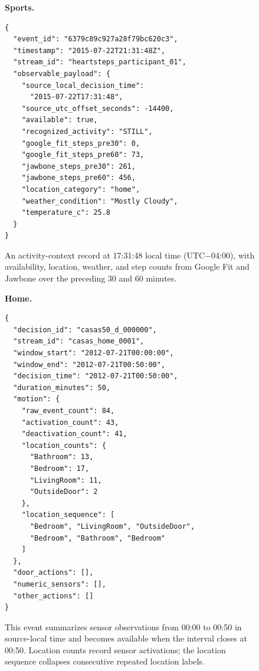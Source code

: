 \begin{figure}[p]
\centering
\begin{minipage}[t]{0.48\textwidth}
\textbf{Sports.}
\begin{lstlisting}[style=inputevent]
{
  "event_id": "6379c89c927a28f79bc620c3",
  "timestamp": "2015-07-22T21:31:48Z",
  "stream_id": "heartsteps_participant_01",
  "observable_payload": {
    "source_local_decision_time":
      "2015-07-22T17:31:48",
    "source_utc_offset_seconds": -14400,
    "available": true,
    "recognized_activity": "STILL",
    "google_fit_steps_pre30": 0,
    "google_fit_steps_pre60": 73,
    "jawbone_steps_pre30": 261,
    "jawbone_steps_pre60": 456,
    "location_category": "home",
    "weather_condition": "Mostly Cloudy",
    "temperature_c": 25.8
  }
}
\end{lstlisting}
An activity-context record at 17:31:48 local time (UTC$-$04:00), with availability, location, weather, and step counts from Google Fit and Jawbone over the preceding 30 and 60 minutes.
\end{minipage}\hfill
\begin{minipage}[t]{0.48\textwidth}
\textbf{Home.}
\begin{lstlisting}[style=inputevent]
{
  "decision_id": "casas50_d_000000",
  "stream_id": "casas_home_0001",
  "window_start": "2012-07-21T00:00:00",
  "window_end": "2012-07-21T00:50:00",
  "decision_time": "2012-07-21T00:50:00",
  "duration_minutes": 50,
  "motion": {
    "raw_event_count": 84,
    "activation_count": 43,
    "deactivation_count": 41,
    "location_counts": {
      "Bathroom": 13,
      "Bedroom": 17,
      "LivingRoom": 11,
      "OutsideDoor": 2
    },
    "location_sequence": [
      "Bedroom", "LivingRoom", "OutsideDoor",
      "Bedroom", "Bathroom", "Bedroom"
    ]
  },
  "door_actions": [],
  "numeric_sensors": [],
  "other_actions": []
}
\end{lstlisting}
This event summarizes sensor observations from 00:00 to 00:50 in source-local time and becomes available when the interval closes at 00:50.
Location counts record sensor activations; the location sequence collapses consecutive repeated location labels.
\end{minipage}


\end{figure}
